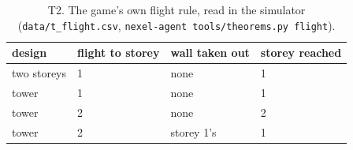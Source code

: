 \begin{table}[h]\centering
\begin{tabular}{llll}\toprule
design & flight to storey & wall taken out & storey reached\\\midrule
two storeys & 1 & none & 1\\
tower & 1 & none & 1\\
tower & 2 & none & 2\\
tower & 2 & storey 1's & 1\\\bottomrule
\end{tabular}\caption{T2. The game's own flight rule, read in the simulator (\texttt{data/t\_flight.csv}, \texttt{nexel-agent tools/theorems.py flight}).}
\end{table}
